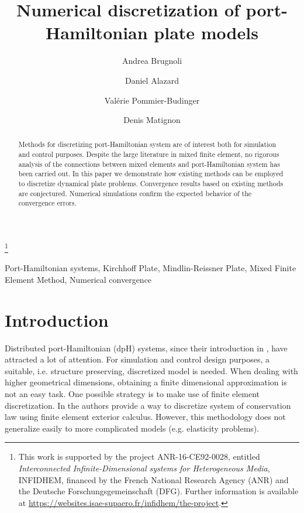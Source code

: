 \documentclass{ifacconf}
\begin{document}
\begin{frontmatter}

\title{Numerical discretization of port-Hamiltonian plate models } 

\thanks[footnoteinfo]{This work is  supported by the project ANR-16-CE92-0028,
	entitled {\em Interconnected Infinite-Dimensional systems for Heterogeneous
		Media}, INFIDHEM, financed by the French National
	Research Agency (ANR) and the Deutsche Forschungsgemeinschaft (DFG). Further information is available at {\url{https://websites.isae-supaero.fr/infidhem/the-project}}.
	}

\author[ISAE]{Andrea Brugnoli}
\author[ISAE]{Daniel Alazard} 
\author[ISAE]{Val\'erie Pommier-Budinger}
\author[ISAE]{Denis Matignon}

\address[ISAE]{ISAE-SUPAERO, Universit\'e de Toulouse, France.\\
	10 Avenue Edouard Belin, BP-54032, 31055 Toulouse Cedex 4. \\
	Andrea.Brugnoli@isae.fr,  Daniel.Alazard@isae.fr, \\
	Valerie.Budinger@isae.fr, Denis.Matignon@isae.fr}

\begin{abstract}
Methods for discretizing port-Hamiltonian system are of interest both for simulation and control purposes. Despite the large literature in mixed finite element, no rigorous analysis of the connections between mixed elements and port-Hamiltonian system has been carried out. In this paper we demonstrate how existing methods can be employed to discretize dynamical plate problems. Convergence results based on existing methods are conjectured. Numerical simulations confirm the expected behavior of the convergence errors.
\end{abstract}

\begin{keyword}
Port-Hamiltonian systems, Kirchhoff Plate, Mindlin-Reissner Plate, Mixed Finite Element Method, Numerical convergence
\end{keyword}

\end{frontmatter}

\section{Introduction}
Distributed port-Hamiltonian (dpH) systems, since their introduction in \cite{VANDERSCHAFTdph}, have attracted a lot of attention. For simulation and control design purposes, a suitable, i.e. structure preserving, discretized model is needed. When dealing with higher geometrical dimensions, obtaining a finite dimensional approximation is not an easy task. One possible strategy is to make use of finite element discretization. In \cite{WeakForm_Kot} the authors provide a way to discretize system of conservation law using finite element exterior calculus. However, this methodology does not generalize easily to more complicated models (e.g. elasticity problems).
\end{document}
